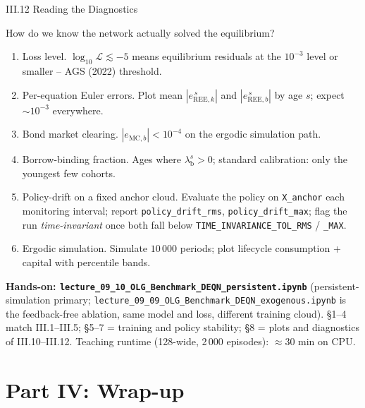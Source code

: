 \documentclass[aspectratio=169,11pt]{beamer}
\newcommand{\emphc}[1]{\textcolor{harvardcrimson}{#1}}
\newcommand{\Loss}{\mathcal{L}}
\begin{document}
\begin{frame}{III.12 Reading the Diagnostics}
\footnotesize
\begin{block}{How do we know the network actually solved the equilibrium?}
\vspace{-2pt}\begin{enumerate}\itemsep1pt
    \item \emphc{Loss level.}  $\log_{10}\Loss \lesssim -5$ means equilibrium residuals at the $10^{-3}$ level or smaller -- AGS (2022) threshold.
    \item \emphc{Per-equation Euler errors.}  Plot mean $|e_{\text{REE},k}^{\,s}|$ and $|e_{\text{REE},b}^{\,s}|$ by age $s$; expect $\sim 10^{-3}$ everywhere.
    \item \emphc{Bond market clearing.}  $|e_{\text{MC},b}| < 10^{-4}$ on the ergodic simulation path.
    \item \emphc{Borrow-binding fraction.}  Ages where $\lambda_{\text{b}}^s > 0$; standard calibration: only the youngest few cohorts.
    \item \emphc{Policy-drift on a fixed anchor cloud.}  Evaluate the policy on \texttt{X\_anchor} each monitoring interval; report \texttt{policy\_drift\_rms}, \texttt{policy\_drift\_max}; flag the run \emph{time-invariant} once both fall below \texttt{TIME\_INVARIANCE\_TOL\_RMS} / \texttt{\_MAX}.
    \item \emphc{Ergodic simulation.}  Simulate $10\,000$ periods; plot lifecycle consumption + capital with percentile bands.
\end{enumerate}
\end{block}

\vspace{-2pt}
\textbf{Hands-on: \texttt{lecture\_09\_10\_OLG\_Benchmark\_DEQN\_persistent.ipynb}} (persistent-simulation primary; \texttt{lecture\_09\_09\_OLG\_Benchmark\_DEQN\_exogenous.ipynb} is the feedback-free ablation, same model and loss, different training cloud).  \S 1--4 match III.1--III.5; \S 5--7 = training and policy stability; \S 8 = plots and diagnostics of III.10--III.12.  Teaching runtime (128-wide, 2\,000 episodes): $\approx 30$ min on CPU.
\end{frame}



\section{Part IV: Wrap-up}
\end{document}

